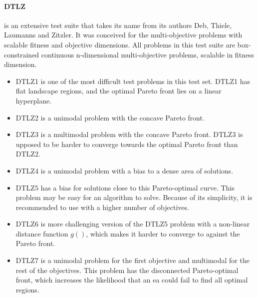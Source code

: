         \paragraph{DTLZ}\cite{DebTLZ05} is an extensive test suite that takes its name from its authors Deb, Thiele, Laumanns and Zitzler. It was conceived for the multi-objective problems with scalable fitness and objective dimensions.  All problems in this test suite are box-constrained continuous n-dimensional multi-objective problems, scalable in fitness dimension. 
        \begin{itemize}
            \item DTLZ1  is one of the most difficult test problems in this test set. DTLZ1 has flat landscape regions, and the optimal Pareto front lies on a linear hyperplane. 
            \item DTLZ2 is a unimodal problem with the concave Pareto front.
            \item DTLZ3 is a multimodal problem with the concave Pareto front. DTLZ3 is upposed to be harder to converge towards the optimal Pareto front than DTLZ2.
            \item DTLZ4 is a unimodal problem with a bias to a dense area of solutions.
            \item DTLZ5 has a bias for solutions close to this Pareto-optimal curve. This problem may be easy for an algorithm to solve. Because of its simplicity, it is recommended to use with a higher number of objectives.
            \item DTLZ6 is more challenging version of the DTLZ5 problem with a non-linear distance function $g()$, which makes it harder to converge to against the Pareto front.
            \item DTLZ7 is a unimodal problem for the first objective and multimodal for the rest of the objectives. This problem has the disconnected Pareto-optimal front, which increases the likelihood that an \gls{ea} could fail to find all optimal regions.
        \end{itemize}


